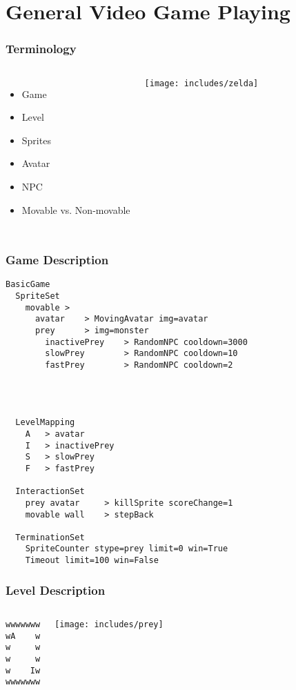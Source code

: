 \documentclass[aspectratio=169]{beamer}
\begin{document}
\section{General Video Game Playing}
\begin{frame}
	\frametitle{Terminology}
	\begin{columns}
		\begin{itemize}
			\item Game
			\item Level
			\item Sprites
			\item Avatar
			\item NPC
			\item Movable vs. Non-movable
		\end{itemize}
		\texttt{[image: includes/zelda]}
	\end{columns}

\end{frame}
\begin{frame}
	\frametitle{Game Description}
	\begin{lstlisting}[caption=Game Description, frame=tb]
BasicGame
  SpriteSet
    movable >
      avatar    > MovingAvatar img=avatar
      prey      > img=monster
        inactivePrey    > RandomNPC cooldown=3000
        slowPrey        > RandomNPC cooldown=10
        fastPrey        > RandomNPC cooldown=2




  LevelMapping
    A   > avatar
    I   > inactivePrey
    S   > slowPrey
    F   > fastPrey

  InteractionSet
    prey avatar     > killSprite scoreChange=1
    movable wall    > stepBack

  TerminationSet
    SpriteCounter stype=prey limit=0 win=True
    Timeout limit=100 win=False
	\end{lstlisting}
\end{frame}

\begin{frame}[fragile]
	\frametitle{Level Description}
	\begin{columns}[c]
		\column{.5\textwidth}
		\centering
		\begin{lstlisting}[caption=Level, frame=tb, xleftmargin=.3\textwidth, xrightmargin=.3\textwidth]
wwwwwww
wA    w
w     w
w     w
w    Iw
wwwwwww
		\end{lstlisting}
		\column{.5\textwidth}
		\texttt{[image: includes/prey]}
	\end{columns}
\end{frame}
\end{document}
